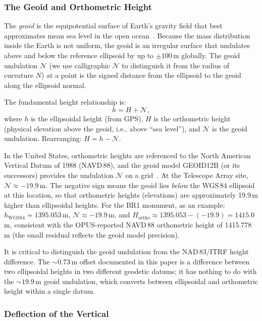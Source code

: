 \subsubsection{The Geoid and Orthometric Height}
\label{sec:geoid}

The \emph{geoid} is the equipotential surface of Earth's gravity field that best approximates mean sea level in the open ocean~\cite{torge2012}. Because the mass distribution inside the Earth is not uniform, the geoid is an irregular surface that undulates above and below the reference ellipsoid by up to $\pm 100$\,m globally. The geoid undulation $\mathcal{N}$ (we use calligraphic $\mathcal{N}$ to distinguish it from the radius of curvature $N$) at a point is the signed distance from the ellipsoid to the geoid along the ellipsoid normal.

The fundamental height relationship is:
\begin{equation}
h = H + \mathcal{N},
\label{eq:height_relation}
\end{equation}
where $h$ is the ellipsoidal height (from GPS), $H$ is the orthometric height (physical elevation above the geoid, i.e., above ``sea level''), and $\mathcal{N}$ is the geoid undulation. Rearranging: $H = h - \mathcal{N}$.

In the United States, orthometric heights are referenced to the North American Vertical Datum of 1988 (NAVD\,88), and the geoid model GEOID12B (or its successors) provides the undulation $\mathcal{N}$ on a grid~\cite{roman2012}. At the Telescope Array site, $\mathcal{N} \approx -19.9$\,m. The negative sign means the geoid lies \emph{below} the WGS\,84 ellipsoid at this location, so that orthometric heights (elevations) are approximately 19.9\,m higher than ellipsoidal heights. For the BR1 monument, as an example: $h_{\text{WGS84}} = 1395.053$\,m, $\mathcal{N} \approx -19.9$\,m, and $H_{\text{ortho}} \approx 1395.053 - (-19.9) = 1415.0$\,m, consistent with the OPUS-reported NAVD\,88 orthometric height of 1415.778\,m (the small residual reflects the geoid model precision).

It is critical to distinguish the geoid undulation from the NAD\,83/ITRF height difference. The $\sim\!0.73$\,m offset documented in this paper is a difference between two ellipsoidal heights in two different geodetic datums; it has nothing to do with the $\sim\!19.9$\,m geoid undulation, which converts between ellipsoidal and orthometric height within a single datum.

\subsubsection{Deflection of the Vertical}
\label{sec:deflection}

